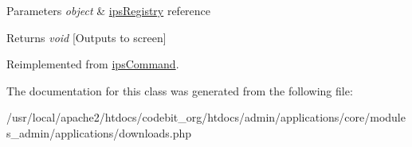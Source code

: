 \begin{DoxyParams}{Parameters}
{\em object} & \hyperlink{classips_registry}{ips\-Registry} reference \\
\hline
\end{DoxyParams}
\begin{DoxyReturn}{Returns}
{\itshape void} \mbox{[}Outputs to screen\mbox{]} 
\end{DoxyReturn}


Reimplemented from \hyperlink{classips_command_afbc4e912a0604b94d47d66744c64d8ba}{ips\-Command}.



The documentation for this class was generated from the following file\-:\begin{DoxyCompactItemize}
\item 
/usr/local/apache2/htdocs/codebit\-\_\-org/htdocs/admin/applications/core/modules\-\_\-admin/applications/downloads.\-php\end{DoxyCompactItemize}
